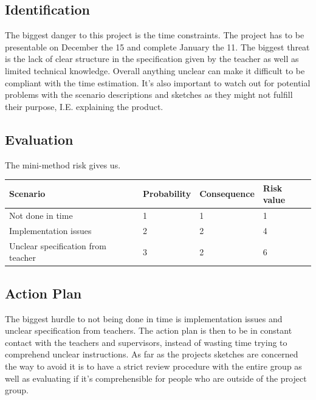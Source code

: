 \documentclass[twoside]{report}
\begin{document}
\subsection{Identification}

The biggest danger to this project is the time constraints. The project has to
be presentable on December the 15 and complete January the 11. The biggest
threat is the lack of clear structure in the specification given by the teacher
as well as limited technical knowledge. Overall anything unclear can make it
difficult to be compliant with the time estimation. It’s also important to
watch out for potential problems with the scenario descriptions and sketches as
they might not fulfill their purpose, I.E. explaining the product. 

\subsection{Evaluation}

The mini-method risk gives us.

\begin{tabular}{|l|l|l|l|}
  \hline
  Scenario & Probability & Consequence & Risk value \\\hline
  Not done in time & 1 & 1 & 1 \\\hline
  Implementation issues & 2 & 2 & 4 \\\hline
  Unclear specification from teacher & 3 & 2 & 6 \\\hline
\end{tabular}

\subsection{Action Plan}

The biggest hurdle to not being done in time is implementation issues and
unclear specification from teachers. The action plan is then to be in constant
contact with the teachers and supervisors, instead of wasting time trying to
comprehend unclear instructions. As far as the projects sketches are concerned
the way to avoid it is to have a strict review procedure with the entire group
as well as evaluating if it’s comprehensible for people who are outside of the
project group. 

\newpage
\end{document}

